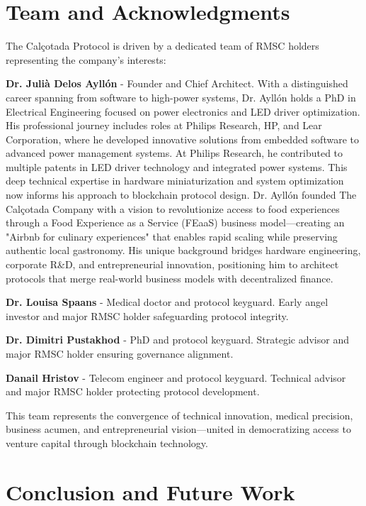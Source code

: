\documentclass[conference]{IEEEtran}
\begin{document}
\section{Team and Acknowledgments}

The Calçotada Protocol is driven by a dedicated team of RMSC holders representing the company's interests:

\textbf{Dr. Julià Delos Ayllón} - Founder and Chief Architect. With a distinguished career spanning from software to high-power systems, Dr. Ayllón holds a PhD in Electrical Engineering focused on power electronics and LED driver optimization. His professional journey includes roles at Philips Research, HP, and Lear Corporation, where he developed innovative solutions from embedded software to advanced power management systems. At Philips Research, he contributed to multiple patents in LED driver technology and integrated power systems. This deep technical expertise in hardware miniaturization and system optimization now informs his approach to blockchain protocol design. Dr. Ayllón founded The Calçotada Company with a vision to revolutionize access to food experiences through a Food Experience as a Service (FEaaS) business model—creating an "Airbnb for culinary experiences" that enables rapid scaling while preserving authentic local gastronomy. His unique background bridges hardware engineering, corporate R\&D, and entrepreneurial innovation, positioning him to architect protocols that merge real-world business models with decentralized finance.

\textbf{Dr. Louisa Spaans} - Medical doctor and protocol keyguard. Early angel investor and major RMSC holder safeguarding protocol integrity.

\textbf{Dr. Dimitri Pustakhod} - PhD and protocol keyguard. Strategic advisor and major RMSC holder ensuring governance alignment.

\textbf{Danail Hristov} - Telecom engineer and protocol keyguard. Technical advisor and major RMSC holder protecting protocol development.

This team represents the convergence of technical innovation, medical precision, business acumen, and entrepreneurial vision—united in democratizing access to venture capital through blockchain technology.

\section{Conclusion and Future Work}
\end{document}
